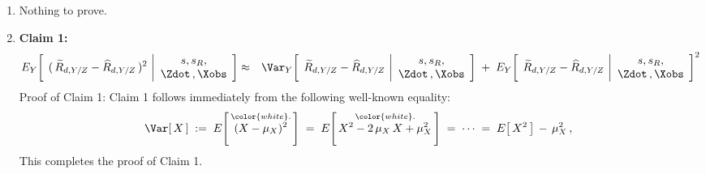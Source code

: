 \begin{enumerate}
\item
    Nothing to prove.
\item
    \textbf{Claim 1:}\quad
    \begin{eqnarray*}
    E_{Y}\!\left[\;\,
        (\,\widetilde{R}_{d,Y/Z} - \widehat{R}_{d,Y/Z}\,)^{2}
        \,\left\vert
        \begin{array}{c}
            s,s_{R},
            \\
            \Zdot\,,\Xobs
            \end{array}
        \right.
        \!\right]
    & \approx &
        \Var_{Y}\!\left[\;\,
            \widetilde{R}_{d,Y/Z} - \widehat{R}_{d,Y/Z}
            \,\left\vert
            \begin{array}{c}
                s,s_{R},
                \\
                \Zdot\,,\Xobs
                \end{array}
            \right.
            \!\right]
        \; + \;
        E_{Y}\!\left[\;\,
            \widetilde{R}_{d,Y/Z} - \widehat{R}_{d,Y/Z}
            \,\left\vert
            \begin{array}{c}
                s,s_{R},
                \\
                \Zdot\,,\Xobs
                \end{array}
            \right.
            \!\right]^{2}
    \end{eqnarray*}
    \vskip 0.1cm
    \noindent
    Proof of Claim 1:\;\;
    Claim 1 follows immediately from the following well-known equality:
    \begin{equation*}
    \Var[\,X\,]
    \; := \;
        E\!\left[\,\overset{{\color{white}.}}{(X - \mu_{X})^{2}}\,\right]
    \; = \;
        E\!\left[\,\overset{{\color{white}.}}{X^{2} - 2\,\mu_{X}\,X + \mu_{X}^{2}}\,\right]
    \; = \;
        \cdots
    \; = \;
        E\!\left[\,X^{2}\,\right] \,-\, \mu_{X}^{2}\,,
    \end{equation*}
    This completes the proof of Claim 1.


\end{enumerate}
